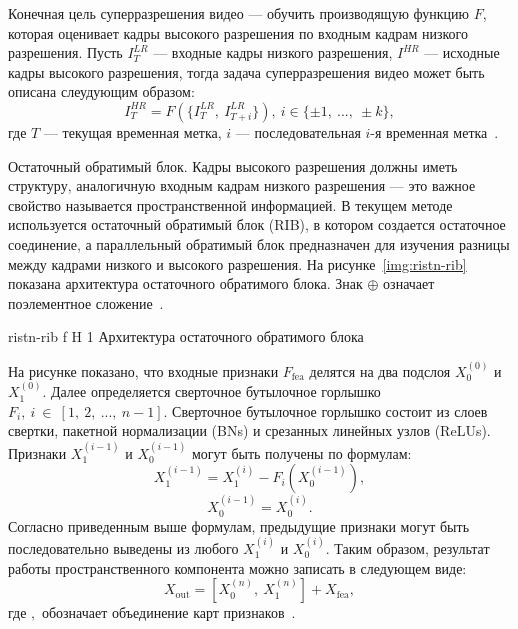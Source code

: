 \documentclass{bmstu}
\begin{document}
Конечная цель суперразрешения видео --- обучить производящую функцию $F$, которая оценивает кадры высокого разрешения по входным кадрам низкого разрешения. 
Пусть $I^{LR}_T$ --- входные кадры низкого разрешения, $I^{HR}$ --- исходные кадры высокого разрешения, тогда задача суперразрешения видео может быть описана слеудующим образом:
\begin{equation}
I^{HR}_T = F(\{I^{LR}_T,~I^{LR}_{T + i}\}),~i \in \{\pm 1,~...,~\pm k\},
\end{equation}
где $T$ --- текущая временная метка, $i$ --- последовательная $i$-я временная метка~\cite{Xiaobin2019}.

Остаточный обратимый блок. 
Кадры высокого разрешения должны иметь структуру, аналогичную входным кадрам низкого разрешения --- это важное свойство называется пространственной информацией. 
В текущем методе используется остаточный обратимый блок (RIB), в котором создается остаточное соединение, а параллельный обратимый блок предназначен для изучения разницы между кадрами низкого и высокого разрешения. 
На рисунке~\ref{img:ristn-rib} показана архитектура остаточного обратимого блока. 
Знак $\oplus$ означает поэлементное сложение~\cite{Xiaobin2019}.

    {ristn-rib}
    {f}
    {H}
    {1\textwidth}
    {Архитектура остаточного обратимого блока~\cite{Xiaobin2019}}
    
На рисунке показано, что входные признаки $F_{\text{fea}}$ делятся на два подслоя $X^{(0)}_{0}$ и $X^{(0)}_{1}$. 
Далее определяется сверточное бутылочное горлышко $F_i,~i~\in~[1,~2,~...,~n - 1]$. 
Сверточное бутылочное горлышко состоит из слоев свертки, пакетной нормализации (BNs) и срезанных линейных узлов (ReLUs). 
Признаки $X^{(i - 1)}_{1}$ и $X^{(i - 1)}_{0}$ могут быть получены по формулам:
\begin{equation}
X^{(i - 1)}_{1} = X^{(i)}_{1} - F_{i}(X^{(i - 1)}_{0}),
\end{equation}
\begin{equation}
X^{(i - 1)}_{0} = X^{(i)}_{0}.
\end{equation}
Согласно приведенным выше формулам, предыдущие признаки могут быть последовательно выведены из любого $X^{(i)}_{1}$ и $X^{(i)}_{0}$. 
Таким образом, результат работы пространственного компонента можно записать в следующем виде:
\begin{equation}
X_{\text{out}} = [X^{(n)}_{0},~X^{(n)}_{1}] + X_{\text{fea}},
\end{equation}
где $,$ обозначает объединение карт признаков~\cite{Xiaobin2019}.
\end{document}
